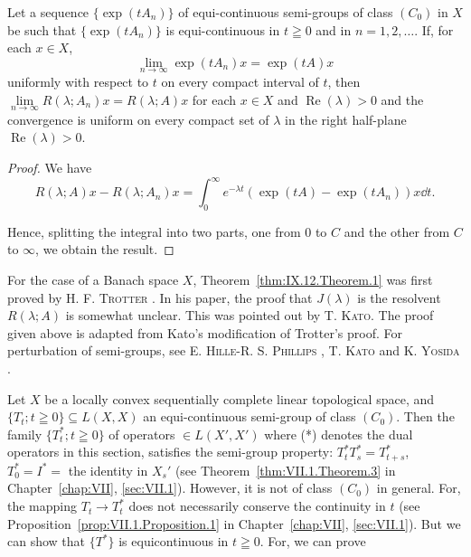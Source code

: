 \begin{theorem}\label{thm:IX.12.Theorem.2} Let a sequence $\{\exp (tA_n)\}$ of equi-continuous semi-groups of class $(C_0)$ in $X$ be such that $\{\exp (tA_n)\}$ is equi-continuous in $t\geqq 0$ and in $n = 1,2,\ldots$. If, for each $x\in X$, 
\[
\lim\limits _{n \rightarrow \infty} \exp (t A _{n}) x = \exp (t A) x
\]
uniformly with respect to $t$ on every compact interval of $t$, then 
$\lim\limits_{n \to \infty} R(\lambda; A_n) x = R(\lambda; A) x$ for each $x \in X$ and $\operatorname{Re}(\lambda) > 0$ and the convergence is uniform on every compact set of $\lambda$ in the right half-plane $\operatorname{Re}(\lambda) > 0$. 
\end{theorem}

\begin{proof}
 We have 
\[
R (\lambda ; A) x - R (\lambda ; A _{n}) x = \int_{0} ^{\infty} e ^{- \lambda t} (\exp (t A) - \exp (t A _{n})) x \dd t. \]

Hence, splitting the integral into two parts, one from $0$ to $C$ and the other from $C$ to $\infty$, we obtain the result. 
\end{proof}

\begin{remarku} For the case of a Banach space $X$, Theorem~\ref{thm:IX.12.Theorem.1} was first proved by H. F. \textsc{Trotter} \cite{trotter327}. In his paper, the proof that $J(\lambda)$ is the resolvent $R(\lambda; A)$ is somewhat unclear. This was pointed out by T. \textsc{Kato}. The proof given above is adapted from Kato's modification of Trotter's proof. For perturbation of semi-groups, see E. \textsc{Hille}-R. S. \textsc{Phillips} \cite{hille97}, T. \textsc{Kato} \cite{kato142} and K. \textsc{Yosida} \cite{yosida374}. 
\end{remarku}


\label{sec:IX.13}

Let $X$ be a locally convex sequentially complete linear topological space, and $\{T_t; t \geqq 0\} \subseteq L(X, X)$ an equi-continuous semi-group of class $(C_0)$. Then the family $\{T_t^*; t \geqq 0\}$ of operators $\in L(X', X')$ where (*) denotes the dual operators in this section, satisfies the semi-group property: $T_t^* T_s^* = T_{t+s}^*$, $T_0^* = I^* =$ the identity in $X_s'$ (see Theorem~\ref{thm:VII.1.Theorem.3} in Chapter~\ref{chap:VII}, \ref{sec:VII.1}). However, it is not of class $(C_0)$ in general. For, the mapping $T_t \to T_t^*$ does not necessarily conserve the continuity in $t$ (see Proposition~\ref{prop:VII.1.Proposition.1} in Chapter~\ref{chap:VII}, \ref{sec:VII.1}). But we can show that $\{T^*\}$ is equicontinuous in $t \geqq 0$. For, we can prove 

